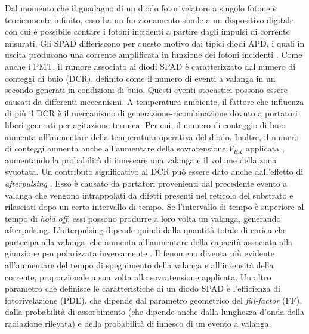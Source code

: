 Dal momento che il guadagno di un diodo fotorivelatore a singolo fotone è teoricamente infinito, esso ha un funzionamento simile a un dispositivo digitale con cui è possibile contare i fotoni incidenti a partire dagli impulsi di corrente misurati. Gli SPAD differiscono per questo motivo dai tipici diodi APD, i quali in uscita producono una corrente amplificata in funzione dei fotoni incidenti \cite{Jiang2019}. Come anche i PMT, il rumore associato ai diodi SPAD è caratterizzato dal numero di conteggi di buio (DCR), definito come il numero di eventi a valanga in un secondo generati in condizioni di buio. Questi eventi stocastici possono essere causati da differenti meccanismi. A temperatura ambiente, il fattore che influenza di più il DCR è il meccanismo di generazione-ricombinazione dovuto a portatori liberi generati per agitazione termica. Per cui, il numero di conteggio di buio aumenta all'aumentare della temperatura operativa del diodo. Inoltre, il numero di conteggi aumenta anche all'aumentare della sovratensione $V_{EX}$ applicata \cite{DiFranco2002}, aumentando la probabilità di innescare una valanga e il volume della zona svuotata. Un contributo significativo al DCR può essere dato anche dall'effetto di \textit{afterpulsing} \cite{DiFranco2002}. Esso è causato da portatori provenienti dal precedente evento a valanga che vengono intrappolati da difetti presenti nel reticolo del substrato e rilasciati dopo un certo intervallo di tempo. Se l'intervallo di tempo è superiore al tempo di \textit{hold off}, essi possono produrre a loro volta un valanga, generando afterpulsing. L'afterpulsing dipende quindi dalla quantità totale di carica che partecipa alla valanga, che aumenta all'aumentare della capacità associata alla giunzione p-n polarizzata inversamente \cite{Palubiak2011}. Il fenomeno diventa più evidente all'aumentare del tempo di spegnimento della valanga e all'intensità della corrente, proporzionale a sua volta alla sovratensione applicata. Un altro parametro che definisce le caratteristiche di un diodo SPAD è l'efficienza di fotorivelazione (PDE), che dipende dal parametro geometrico del \textit{fill-factor} (FF), dalla probabilità di assorbimento (che dipende anche dalla lunghezza d'onda della radiazione rilevata) e della probabilità di innesco di un evento a valanga.

